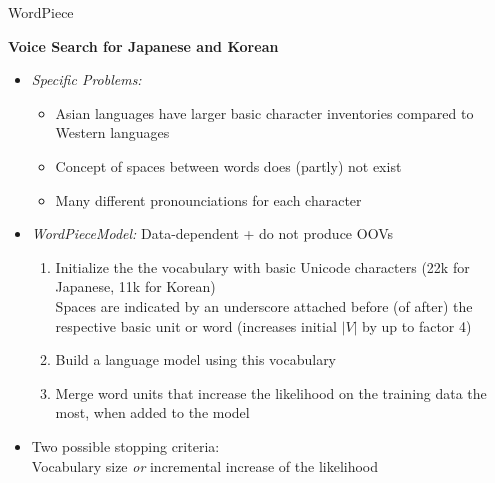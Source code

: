 \documentclass[]{beamer}
\newcommand\warning{%
 \makebox[1.4em][c]{%
 \makebox[0pt][c]{\raisebox{.1em}{\scriptsize!}}%
 \makebox[0pt][c]{\color{red}\normalsize$\bigtriangleup$}}}%
\begin{document}
\begin{frame}{WordPiece}

	\textbf{Voice Search for Japanese and Korean \href{https://storage.googleapis.com/pub-tools-public-publication-data/pdf/37842.pdf}{}}

	\begin{itemize}
		\item \textit{Specific Problems:} 
			\begin{itemize}
				\item Asian languages have larger basic character inventories compared to Western languages
				\item Concept of spaces between words does (partly) not exist
				\item Many different pronounciations for each character
			\end{itemize}
		\item \textit{WordPieceModel:} Data-dependent + do not produce OOVs
			\begin{enumerate}
				\item Initialize the the vocabulary with basic Unicode characters (22k for Japanese, 11k for Korean)\\
							\warning Spaces are indicated by an underscore attached before (of after) the respective basic unit or word (increases initial $|V|$ by up to factor 4)
				\item Build a language model using this vocabulary
				\item Merge word units that increase the likelihood on the training data the most, when added to the model
			\end{enumerate}
		\item Two possible stopping criteria:\\Vocabulary size \textit{or} incremental increase of the likelihood
	\end{itemize}
\end{frame}
\end{document}
